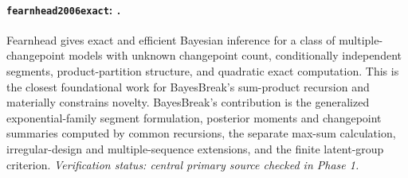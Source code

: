 
\paragraph{\texttt{fearnhead2006exact}: \citet{fearnhead2006exact}.}
Fearnhead gives exact and efficient Bayesian inference for a class of multiple-changepoint models with unknown changepoint count, conditionally independent segments, product-partition structure, and quadratic exact computation. This is the closest foundational work for BayesBreak's sum-product recursion and materially constrains novelty. BayesBreak's contribution is the generalized exponential-family segment formulation, posterior moments and changepoint summaries computed by common recursions, the separate max-sum calculation, irregular-design and multiple-sequence extensions, and the finite latent-group criterion. \textit{Verification status: central primary source checked in Phase 1.}
